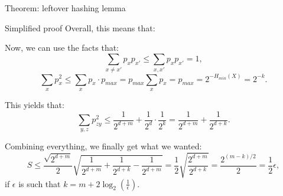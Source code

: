 \documentclass[a4paper]{article}
\begin{document}
\begin{parag}{Theorem: leftover hashing lemma}
\begin{subparag}{Simplified proof}
        Overall, this means that:

        Now, we can use the facts that: 
        \[\sum_{x \neq x'} p_x p_{x'} \leq \sum_{x, x'} p_{x} p_{x'} = 1,\]
        \[\sum_{x} p_{x}^2 \leq \sum_{x} p_x\cdot p_{max} = p_{max} \sum_{x} p_x = p_{max} = 2^{- H_{min}\left(X\right)} = 2^{-k}.\]
        
        This yields that: 
        \[\sum_{y, z} p_{zy}^2 \leq \frac{1}{2^{d + m}} + \frac{1}{2^d} \cdot \frac{1}{2^k} = \frac{1}{2^{d + m}} + \frac{1}{2^{d + k}}.\]
        
        Combining everything, we finally get what we wanted: 
        \[S \leq \frac{\sqrt{2^{d + m}}}{2} \sqrt{\frac{1}{2^{d+m}} + \frac{1}{2^{d + k}} - \frac{1}{2^{d + m}}} = \frac{1}{2} \sqrt{\frac{2^{d + m}}{2^{d + k}}} = \frac{2^{\left(m -k\right)/2}}{2} = \frac{1}{2} \epsilon,\]
        if $\epsilon$ is such that $k = m + 2 \log_2\left(\frac{1}{\epsilon}\right)$.
        

    \end{subparag}
\end{parag}
\end{document}
